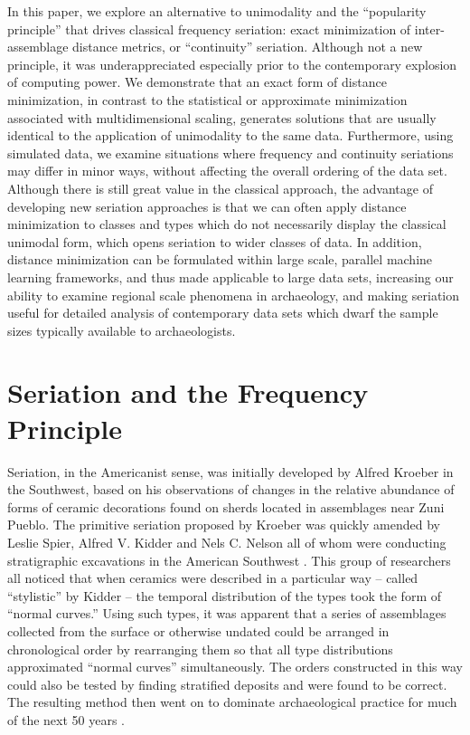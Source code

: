 In this paper, we explore an alternative to unimodality and the
``popularity principle'' that drives classical frequency seriation:
exact minimization of inter-assemblage distance metrics, or
``continuity'' seriation. Although not a new principle, it was
underappreciated especially prior to the contemporary explosion of
computing power. We demonstrate that an exact form of distance
minimization, in contrast to the statistical or approximate minimization
associated with multidimensional scaling, generates solutions that are
usually identical to the application of unimodality to the same data.
Furthermore, using simulated data, we examine situations where frequency
and continuity seriations may differ in minor ways, without affecting
the overall ordering of the data set. Although there is still great
value in the classical approach, the advantage of developing new
seriation approaches is that we can often apply distance minimization to
classes and types which do not necessarily display the classical
unimodal form, which opens seriation to wider classes of data. In
addition, distance minimization can be formulated within large scale,
parallel machine learning frameworks, and thus made applicable to large
data sets, increasing our ability to examine regional scale phenomena in archaeology, and making seriation useful for detailed analysis of contemporary data sets which dwarf the sample sizes typically available to archaeologists.

\section{Seriation and the Frequency
Principle}\label{seriation-and-the-frequency-principle}

Seriation, in the Americanist sense, was initially developed by Alfred
Kroeber \citep{Kroeber1916} in the Southwest, based on his observations
of changes in the relative abundance of forms of ceramic decorations
found on sherds located in assemblages near Zuni Pueblo. The primitive
seriation proposed by Kroeber was quickly amended by Leslie Spier,
Alfred V. Kidder and Nels C. Nelson all of whom were conducting
stratigraphic excavations in the American Southwest
\citep{Kidder1917, Nelson1916, Spier1917}. This group of researchers all
noticed that when ceramics were described in a particular way -- called
``stylistic'' by Kidder \citeyearpar{Kidder1917} -- the temporal
distribution of the types took the form of ``normal curves.'' Using such
types, it was apparent that a series of assemblages collected from the
surface or otherwise undated could be arranged in chronological order by
rearranging them so that all type distributions approximated ``normal
curves'' simultaneously. The orders constructed in this way could also
be tested by finding stratified deposits and were found to be correct.
The resulting method then went on to dominate archaeological practice
for much of the next 50 years \citep{lyman1997rise}.


